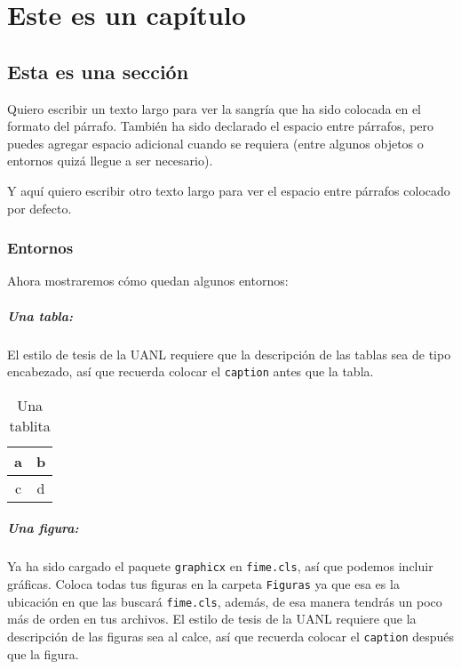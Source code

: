 \chapter{Este es un capítulo}

\section{Esta es una sección}

Quiero escribir un texto largo para ver la sangría que ha sido colocada en el formato del párrafo. También ha sido declarado el espacio entre párrafos, pero puedes agregar espacio adicional cuando se requiera (entre algunos objetos o entornos quizá llegue a ser necesario).

Y aquí quiero escribir otro texto largo para ver el espacio entre párrafos colocado por defecto.

\subsection{Entornos}

Ahora mostraremos cómo quedan algunos entornos:

\paragraph{Una tabla:} El estilo de tesis de la UANL requiere que la descripción de las tablas sea de tipo encabezado, así que recuerda colocar el {\tt caption} antes que la tabla.

\begin{table}[ht]
	\centering
	\caption{Una tablita}
	\label{tab:una-tablita}
		\begin{tabular}{|c|c|}
			\hline
			a & b \\
			\hline
			c & d \\
			\hline
		\end{tabular}
\end{table}

\paragraph{Una figura:} Ya ha sido cargado el paquete {\tt graphicx} en {\tt fime.cls}, así que podemos incluir gráficas. Coloca todas tus figuras en la carpeta {\tt Figuras} ya que esa es la ubicación en que las buscará {\tt fime.cls}, además, de esa manera tendrás un poco más de orden en tus archivos. El estilo de tesis de la UANL requiere que la descripción de las figuras sea al calce, así que recuerda colocar el {\tt caption} después que la figura.

